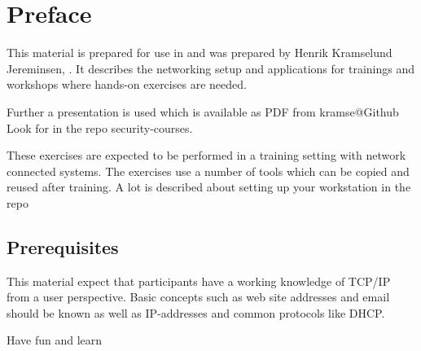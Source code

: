 \documentclass[a4paper,11pt,notitlepage]{report}
\begin{document}
\rm
{}

\newcommand{\emne}[1]{Communication and Network Security workshop}
\newcommand{\kursus}[1]{Communication and Network Security workshop}
\newcommand{\kursusnavn}[1]{Communication and Network Security workshop\\ exercises}




\setcounter{tocdepth}{0}

\normal

{\color{titlecolor}\tableofcontents}

\normal
\pagestyle{fancyplain}
\chapter*{\color{titlecolor}Preface}

This material is prepared for use in \emph{\kursus} and was prepared by
Henrik Kramselund Jereminsen,  .
It describes the networking setup and
applications for trainings and workshops where hands-on exercises are needed.

\vskip 1cm
Further a presentation is used which is available as PDF from kramse@Github\\
Look for \jobname in the repo security-courses.

These exercises are expected to be performed in a training setting with network connected systems. The exercises use a number of tools which can be copied and reused after training. A lot is described about setting up your workstation in the repo




\section*{\color{titlecolor}Prerequisites}

This material expect that participants have a working knowledge of
TCP/IP from a user perspective. Basic concepts such as web site addresses and email should be known as well as IP-addresses and common protocols like DHCP.

\vskip 1cm
Have fun and learn
\eject

\rhead{\fancyplain{}{\bf \chaptername\ \thechapter}}
\end{document}
